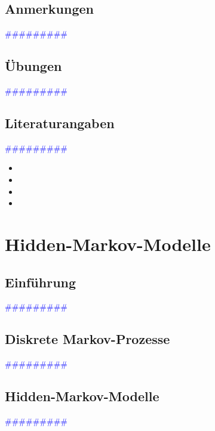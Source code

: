 \documentclass{article}
\begin{document}
  \subsection{Anmerkungen} %
      \textcolor{blue}{\#\#\#\#\#\#\#\#\#}
  \subsection{Übungen} %
      \textcolor{blue}{\#\#\#\#\#\#\#\#\#}
  \subsection{Literaturangaben} %
      \textcolor{blue}{\#\#\#\#\#\#\#\#\#}

      \begin{itemize}
      \color{red}
        \item
        \item
      \color{ForestGreen}
        \item
        \item
      \end{itemize}




\newpage
\section{Hidden-Markov-Modelle} %
  \subsection{Einführung} %
      \textcolor{blue}{\#\#\#\#\#\#\#\#\#}
  \subsection{Diskrete Markov-Prozesse} %
      \textcolor{blue}{\#\#\#\#\#\#\#\#\#}
  \subsection{Hidden-Markov-Modelle} %
      \textcolor{blue}{\#\#\#\#\#\#\#\#\#}
\end{document}
